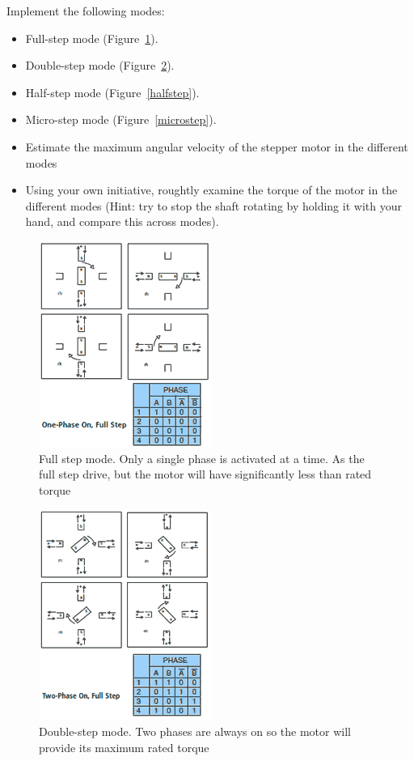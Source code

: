 \documentclass{instructions}
\begin{document}
  Implement the following modes:

  \begin{itemize}
  \item Full-step mode (Figure~\ref{fullstep}).
  \item Double-step mode (Figure~\ref{doublestep}).
  \item Half-step mode (Figure~\ref{halfstep}).
  \item Micro-step mode (Figure~\ref{microstep}).
  \end{itemize}


\begin{itemize}
    \item Estimate the maximum angular velocity of the stepper motor in the different modes

   \item Using your own initiative, roughtly examine the torque of the motor in
        the different modes (Hint: try to stop the shaft rotating by holding
        it with your hand, and compare this across modes).

\end{itemize}


\begin{figure}[h!]
    \centering
    \includegraphics[width=0.4\linewidth]{figs/fullstep.png}
    \caption{Full step mode. Only a single phase is activated at a time.
  As the full step drive, but the motor will have significantly less
    than rated torque}
    \label{fullstep}
\end{figure}


\begin{figure}[h!]
    \centering
    \includegraphics[width=0.4\linewidth]{figs/doublestep.png}
    \caption{Double-step mode. Two phases are always on so the motor will
  provide its maximum rated torque}
    \label{doublestep}
\end{figure}
\end{document}
